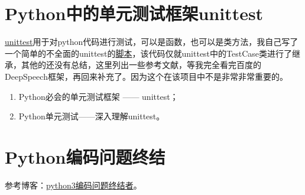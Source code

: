 \section{Python中的单元测试框架unittest}
\href{https://docs.python.org/2.7/library/unittest.html}{unittest}用于对python代码进行测试，可以是函数，也可以是类方法，我自己写了一个简单的不全面的unittest的\href{https://github.com/MXuer/codes/tree/master/unittest}{脚本}，该代码仅就unittest中的TestCase类进行了继承，其他的还没有总结，这里列出一些参考文献，等我完全看完百度的DeepSpeech框架，再回来补充了。因为这个在该项目中不是非常非常重要的。
\begin{enumerate}
  \item Python必会的单元测试框架 —— unittest\cite{csdn-unittest}；
  \item Python单元测试——深入理解unittest\cite{cnblogs-unittest}。
\end{enumerate}


\section{Python编码问题终结}
参考博客：\href{https://cloud.tencent.com/developer/article/1027643}{python3编码问题终结者}。